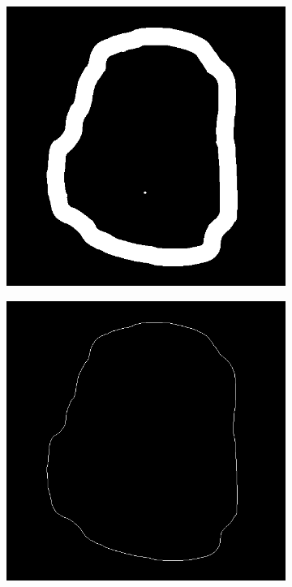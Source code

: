 \begin{figure}[h!]
\begin{subfigure}[b]{0.4\linewidth}
    	\caption{}
    	\label{fig:10mean}
  	\end{subfigure}
  	\begin{subfigure}[b]{0.4\linewidth}
		\includegraphics[width=\linewidth]{myfigure/p10/10_otsu.png}
		\caption{}
		\label{fig:10otsu}
	\end{subfigure}
  	\begin{subfigure}[b]{0.4\linewidth}
		\includegraphics[width=\linewidth]{myfigure/p10/10_long_chain.png}

\end{subfigure}
\end{figure}
